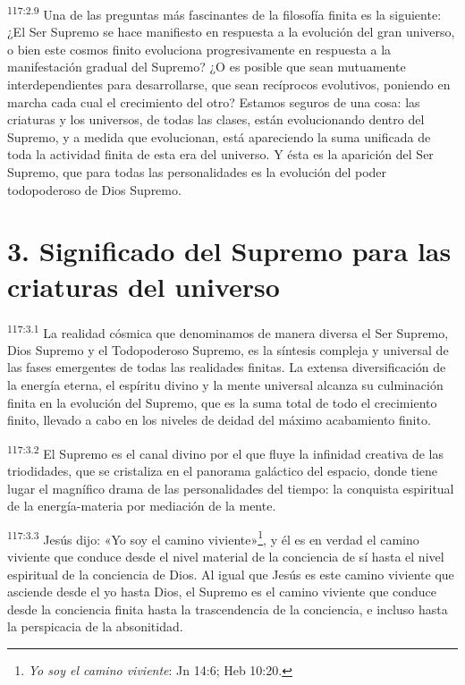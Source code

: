 \par
\textsuperscript{117:2.9} Una de las preguntas más fascinantes de la filosofía finita es la siguiente: ¿El Ser Supremo se hace manifiesto en respuesta a la evolución del gran universo, o bien este cosmos finito evoluciona progresivamente en respuesta a la manifestación gradual del Supremo? ¿O es posible que sean mutuamente interdependientes para desarrollarse, que sean recíprocos evolutivos, poniendo en marcha cada cual el crecimiento del otro? Estamos seguros de una cosa: las criaturas y los universos, de todas las clases, están evolucionando dentro del Supremo, y a medida que evolucionan, está apareciendo la suma unificada de toda la actividad finita de esta era del universo. Y ésta es la aparición del Ser Supremo, que para todas las personalidades es la evolución del poder todopoderoso de Dios Supremo.

\section*{3. Significado del Supremo para las criaturas del universo}
\par
\textsuperscript{117:3.1} La realidad cósmica que denominamos de manera diversa el Ser Supremo, Dios Supremo y el Todopoderoso Supremo, es la síntesis compleja y universal de las fases emergentes de todas las realidades finitas. La extensa diversificación de la energía eterna, el espíritu divino y la mente universal alcanza su culminación finita en la evolución del Supremo, que es la suma total de todo el crecimiento finito, llevado a cabo en los niveles de deidad del máximo acabamiento finito.

\par
\textsuperscript{117:3.2} El Supremo es el canal divino por el que fluye la infinidad creativa de las triodidades, que se cristaliza en el panorama galáctico del espacio, donde tiene lugar el magnífico drama de las personalidades del tiempo: la conquista espiritual de la energía-materia por mediación de la mente.

\par
\textsuperscript{117:3.3} Jesús dijo: «Yo soy el camino viviente»\footnote{\textit{Yo soy el camino viviente}: Jn 14:6; Heb 10:20.}, y él es en verdad el camino viviente que conduce desde el nivel material de la conciencia de sí hasta el nivel espiritual de la conciencia de Dios. Al igual que Jesús es este camino viviente que asciende desde el yo hasta Dios, el Supremo es el camino viviente que conduce desde la conciencia finita hasta la trascendencia de la conciencia, e incluso hasta la perspicacia de la absonitidad.

